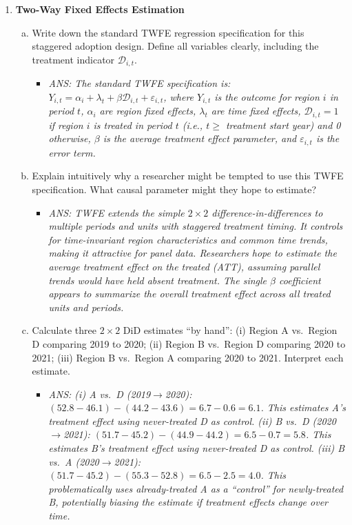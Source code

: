 \documentclass[12pt,a4paper]{article}
\newcommand{\ans}[1]{\begin{itemize}\item[$\bullet$] \textit{ANS: #1}\end{itemize}}
\begin{document}
\begin{enumerate}
\item \textbf{Two-Way Fixed Effects Estimation}
\begin{enumerate}[(a)]
\item Write down the standard TWFE regression specification for this staggered adoption design. Define all variables clearly, including the treatment indicator $\mathcal{D}_{i,t}$.
\ans{The standard TWFE specification is: $Y_{i,t} = \alpha_i + \lambda_t + \beta\mathcal{D}_{i,t} + \varepsilon_{i,t}$, where $Y_{i,t}$ is the outcome for region $i$ in period $t$, $\alpha_i$ are region fixed effects, $\lambda_t$ are time fixed effects, $\mathcal{D}_{i,t} = 1$ if region $i$ is treated in period $t$ (i.e., $t \geq$ treatment start year) and 0 otherwise, $\beta$ is the average treatment effect parameter, and $\varepsilon_{i,t}$ is the error term.}

\item Explain intuitively why a researcher might be tempted to use this TWFE specification. What causal parameter might they hope to estimate?
\ans{TWFE extends the simple $2\times2$ difference-in-differences to multiple periods and units with staggered treatment timing. It controls for time-invariant region characteristics and common time trends, making it attractive for panel data. Researchers hope to estimate the average treatment effect on the treated (ATT), assuming parallel trends would have held absent treatment. The single $\beta$ coefficient appears to summarize the overall treatment effect across all treated units and periods.}

\item Calculate three $2\times2$ DiD estimates ``by hand'': (i) Region A vs.\ Region D comparing 2019 to 2020; (ii) Region B vs.\ Region D comparing 2020 to 2021; (iii) Region B vs.\ Region A comparing 2020 to 2021. Interpret each estimate.
\ans{(i) A vs.\ D (2019$\to$2020): $(52.8 - 46.1) - (44.2 - 43.6) = 6.7-0.6 = 6.1$. This estimates A's treatment effect using never-treated D as control. (ii) B vs.\ D (2020$\to$2021): $(51.7-45.2)-(44.9-44.2) = 6.5 - 0.7 = 5.8$. This estimates B's treatment effect using never-treated D as control. (iii) B vs.\ A (2020$\to$2021): $(51.7 - 45.2) - (55.3 - 52.8) = 6.5 - 2.5 = 4.0$. This problematically uses already-treated A as a ``control'' for newly-treated B, potentially biasing the estimate if treatment effects change over time.}
\end{enumerate}


\end{enumerate}
\end{document}
